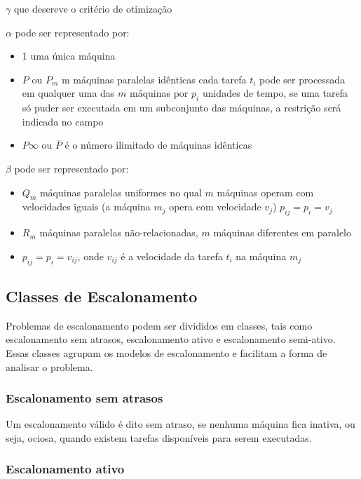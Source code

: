 $\gamma$ que descreve o critério de otimização

$\alpha$ pode ser representado por:

\begin{itemize}
\item 1 uma única máquina
\item $P$ ou $P_m$ m máquinas paralelas idênticas cada tarefa $t_i$ pode ser processada em qualquer uma das $m$ máquinas por $p_i$ unidades de tempo, se uma tarefa só puder ser executada em um subconjunto das máquinas, a restrição será indicada no campo 
\item $P \infty$ ou $\overline{P}$ é o número ilimitado de máquinas idênticas
\end{itemize}

$\beta$ pode ser representado por:
\begin{itemize}
\item $Q_m$ máquinas paralelas uniformes no qual $m$ máquinas  operam com 
velocidades iguais (a máquina $m_j$ opera com velocidade $v_j$) $p_{ij} = p_i=v_j$
\item $R_m$ máquinas paralelas não-relacionadas, $m$ máquinas diferentes em paralelo
\item $p_{ij} = p_i=v_{ij}$, onde $v_{ij}$ é a velocidade da tarefa $t_i$ na máquina $m_j$
\end{itemize}


\subsection{Classes de Escalonamento}

Problemas de escalonamento podem ser divididos em classes, tais como escalonamento sem atrasos, escalonamento ativo e escalonamento semi-ativo. Essas classes agrupam os modelos de escalonamento e facilitam a forma de analisar o problema.

\subsubsection{Escalonamento sem atrasos}

 Um escalonamento válido é dito sem atraso, se nenhuma máquina fica inativa, ou seja, ociosa, quando existem tarefas disponíveis para serem executadas.

\subsubsection{Escalonamento ativo}

